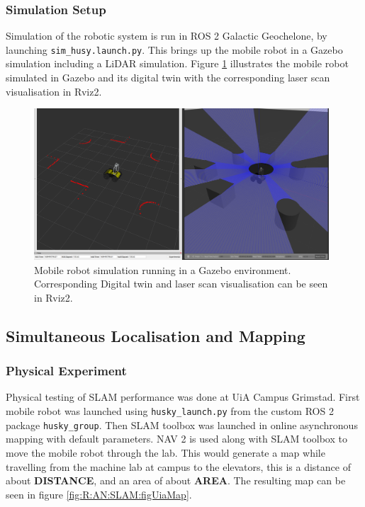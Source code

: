 \FloatBarrier
\subsubsection{Simulation Setup}
Simulation of the robotic system is run in ROS 2 Galactic Geochelone, by launching \lstinline{sim_husy.launch.py}. This brings up the mobile robot in a Gazebo simulation including a LiDAR simulation. Figure \ref{fig:R:CMR:gazeboSim} illustrates the mobile robot simulated in Gazebo and its digital twin with the corresponding laser scan visualisation in Rviz2.

\begin{figure}[htp!]
  \centering
  \includegraphics[width = 0.98\textwidth]{Figures/figHuskyGazebo.pdf}
  \caption{Mobile robot simulation running in a Gazebo environment. Corresponding Digital twin and laser scan visualisation can be seen in Rviz2. }
  \label{fig:R:CMR:gazeboSim}
\end{figure}

\FloatBarrier
\subsection{Simultaneous Localisation and Mapping}\label{sec:R:AN:SLAM}

\FloatBarrier
\subsubsection{Physical Experiment}
Physical testing of SLAM performance was done at UiA Campus Grimstad. First mobile robot was launched using \lstinline{husky_launch.py} from the custom ROS 2 package \lstinline{husky_group}. Then SLAM toolbox was launched in online asynchronous mapping with default parameters. NAV 2 is used along with SLAM toolbox to move the mobile robot through the lab. This would generate a map while travelling from the machine lab at campus to the elevators, this is a distance of about \textbf{DISTANCE}, and an area of about \textbf{AREA}. The resulting map can be seen in figure \ref{fig:R:AN:SLAM:figUiaMap}.

